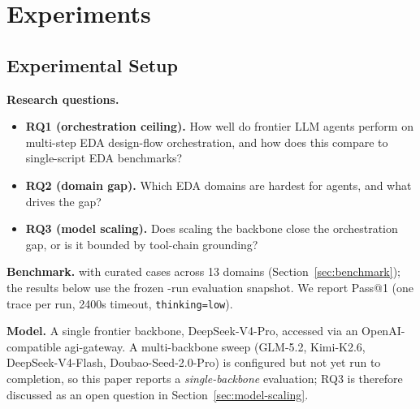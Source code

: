\section{Experiments}
\label{sec:experiments}

\subsection{Experimental Setup}
\label{sec:exp-setup}

\textbf{Research questions.}
\begin{itemize}
    \item \textbf{RQ1 (orchestration ceiling).} How well do frontier LLM agents perform on multi-step EDA design-flow orchestration, and how does this compare to single-script EDA benchmarks?
    \item \textbf{RQ2 (domain gap).} Which EDA domains are hardest for agents, and what drives the gap?
    \item \textbf{RQ3 (model scaling).} Does scaling the backbone close the orchestration gap, or is it bounded by tool-chain grounding?
\end{itemize}

\textbf{Benchmark.} \bench{} with \Ntasks{} curated cases across 13 domains (Section~\ref{sec:benchmark}); the results below use the frozen \Neval{}-run evaluation snapshot. We report Pass@1 (one trace per run, 2400s timeout, \texttt{thinking=low}).

\textbf{Model.} A single frontier backbone, DeepSeek-V4-Pro, accessed via an OpenAI-compatible agi-gateway. A multi-backbone sweep (GLM-5.2, Kimi-K2.6, DeepSeek-V4-Flash, Doubao-Seed-2.0-Pro) is configured but not yet run to completion, so this paper reports a \emph{single-backbone} evaluation; RQ3 is therefore discussed as an open question in Section~\ref{sec:model-scaling}.

